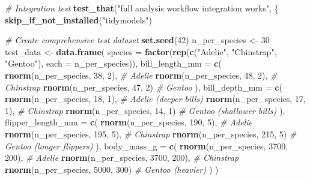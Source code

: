 \documentclass[
]{article}
\newenvironment{Shaded}{\begin{snugshade}}{\end{snugshade}}
\newcommand{\AttributeTok}[1]{\textcolor[rgb]{0.13,0.29,0.53}{#1}}
\newcommand{\CommentTok}[1]{\textcolor[rgb]{0.56,0.35,0.01}{\textit{#1}}}
\newcommand{\DecValTok}[1]{\textcolor[rgb]{0.00,0.00,0.81}{#1}}
\newcommand{\FunctionTok}[1]{\textcolor[rgb]{0.13,0.29,0.53}{\textbf{#1}}}
\newcommand{\NormalTok}[1]{#1}
\newcommand{\OtherTok}[1]{\textcolor[rgb]{0.56,0.35,0.01}{#1}}
\newcommand{\StringTok}[1]{\textcolor[rgb]{0.31,0.60,0.02}{#1}}
\begin{document}
\begin{Shaded}
\begin{Highlighting}[]
\CommentTok{\# Integration test}
\FunctionTok{test\_that}\NormalTok{(}\StringTok{"full analysis workflow integration works"}\NormalTok{, \{}
  \FunctionTok{skip\_if\_not\_installed}\NormalTok{(}\StringTok{"tidymodels"}\NormalTok{)}

  \CommentTok{\# Create comprehensive test dataset}
  \FunctionTok{set.seed}\NormalTok{(}\DecValTok{42}\NormalTok{)}
\NormalTok{  n\_per\_species }\OtherTok{\textless{}{-}} \DecValTok{30}
\NormalTok{  test\_data }\OtherTok{\textless{}{-}} \FunctionTok{data.frame}\NormalTok{(}
    \AttributeTok{species =} \FunctionTok{factor}\NormalTok{(}\FunctionTok{rep}\NormalTok{(}\FunctionTok{c}\NormalTok{(}\StringTok{"Adelie"}\NormalTok{, }\StringTok{"Chinstrap"}\NormalTok{, }\StringTok{"Gentoo"}\NormalTok{), }\AttributeTok{each =}\NormalTok{ n\_per\_species)),}
    \AttributeTok{bill\_length\_mm =} \FunctionTok{c}\NormalTok{(}
      \FunctionTok{rnorm}\NormalTok{(n\_per\_species, }\DecValTok{38}\NormalTok{, }\DecValTok{2}\NormalTok{),    }\CommentTok{\# Adelie}
      \FunctionTok{rnorm}\NormalTok{(n\_per\_species, }\DecValTok{48}\NormalTok{, }\DecValTok{2}\NormalTok{),    }\CommentTok{\# Chinstrap}
      \FunctionTok{rnorm}\NormalTok{(n\_per\_species, }\DecValTok{47}\NormalTok{, }\DecValTok{2}\NormalTok{)     }\CommentTok{\# Gentoo}
\NormalTok{    ),}
    \AttributeTok{bill\_depth\_mm =} \FunctionTok{c}\NormalTok{(}
      \FunctionTok{rnorm}\NormalTok{(n\_per\_species, }\DecValTok{18}\NormalTok{, }\DecValTok{1}\NormalTok{),    }\CommentTok{\# Adelie (deeper bills)}
      \FunctionTok{rnorm}\NormalTok{(n\_per\_species, }\DecValTok{17}\NormalTok{, }\DecValTok{1}\NormalTok{),    }\CommentTok{\# Chinstrap}
      \FunctionTok{rnorm}\NormalTok{(n\_per\_species, }\DecValTok{14}\NormalTok{, }\DecValTok{1}\NormalTok{)     }\CommentTok{\# Gentoo (shallower bills)}
\NormalTok{    ),}
    \AttributeTok{flipper\_length\_mm =} \FunctionTok{c}\NormalTok{(}
      \FunctionTok{rnorm}\NormalTok{(n\_per\_species, }\DecValTok{190}\NormalTok{, }\DecValTok{5}\NormalTok{),   }\CommentTok{\# Adelie}
      \FunctionTok{rnorm}\NormalTok{(n\_per\_species, }\DecValTok{195}\NormalTok{, }\DecValTok{5}\NormalTok{),   }\CommentTok{\# Chinstrap}
      \FunctionTok{rnorm}\NormalTok{(n\_per\_species, }\DecValTok{215}\NormalTok{, }\DecValTok{5}\NormalTok{)    }\CommentTok{\# Gentoo (longer flippers)}
\NormalTok{    ),}
    \AttributeTok{body\_mass\_g =} \FunctionTok{c}\NormalTok{(}
      \FunctionTok{rnorm}\NormalTok{(n\_per\_species, }\DecValTok{3700}\NormalTok{, }\DecValTok{200}\NormalTok{), }\CommentTok{\# Adelie}
      \FunctionTok{rnorm}\NormalTok{(n\_per\_species, }\DecValTok{3700}\NormalTok{, }\DecValTok{200}\NormalTok{), }\CommentTok{\# Chinstrap}
      \FunctionTok{rnorm}\NormalTok{(n\_per\_species, }\DecValTok{5000}\NormalTok{, }\DecValTok{300}\NormalTok{)  }\CommentTok{\# Gentoo (heavier)}
\NormalTok{    )}
\NormalTok{  )}


\end{Highlighting}
\end{Shaded}
\end{document}
